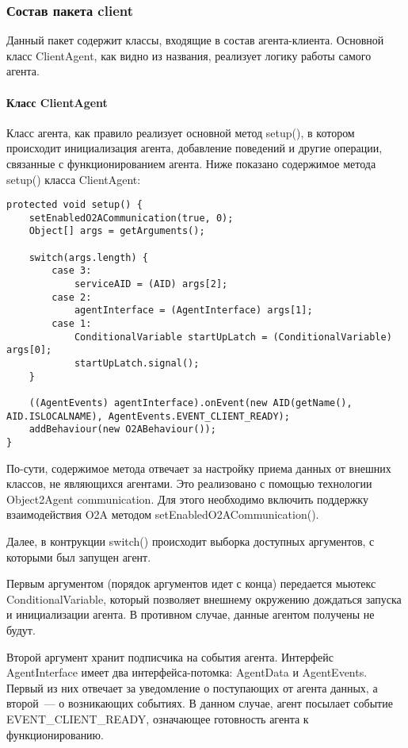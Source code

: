 \subsubsection{Состав пакета client}
Данный пакет содержит классы, входящие в состав агента-клиента. Основной класс ClientAgent, как видно из названия, реализует логику работы самого агента.

\paragraph{Класс ClientAgent}
Класс агента, как правило реализует основной метод setup(), в котором происходит инициализация агента, добавление поведений и другие операции, связанные с функционированием агента.
Ниже показано содержимое метода setup() класса ClientAgent:
\begin{verbatim}
protected void setup() {
    setEnabledO2ACommunication(true, 0);
    Object[] args = getArguments();

    switch(args.length) {
        case 3:
            serviceAID = (AID) args[2];
        case 2:
            agentInterface = (AgentInterface) args[1];
        case 1:
            ConditionalVariable startUpLatch = (ConditionalVariable) args[0];
            startUpLatch.signal();
    }

    ((AgentEvents) agentInterface).onEvent(new AID(getName(), AID.ISLOCALNAME), AgentEvents.EVENT_CLIENT_READY);
    addBehaviour(new O2ABehaviour());
}
\end{verbatim}
По-сути, содержимое метода отвечает за настройку приема данных от внешних классов, не являющихся агентами. Это реализовано с помощью технологии Object2Agent communication. Для этого необходимо включить поддержку взаимодействия O2A методом setEnabledO2ACommunication().

Далее, в контрукции switch() происходит выборка доступных аргументов, с которыми был запущен агент.

Первым аргументом (порядок аргументов идет с конца) передается мьютекс ConditionalVariable, который позволяет внешнему окружению дождаться запуска и инициализации агента. В противном случае, данные агентом получены не будут.

Второй аргумент хранит подписчика на события агента. Интерфейс AgentInterface имеет два интерфейса-потомка: AgentData и AgentEvents. Первый из них отвечает за уведомление о поступающих от агента данных, а второй~--- о возникающих событиях. В данном случае, агент посылает событие EVENT\_CLIENT\_READY, означающее готовность агента к функционированию.

